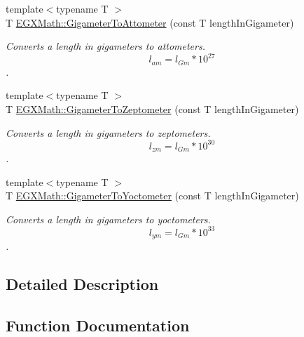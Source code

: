 \begin{DoxyCompactItemize}
{\footnotesize template$<$typename T $>$ }\\T \mbox{\hyperlink{group___e_g_x_math-_conversions-_length_conversions-_gigameter-_s_i_ga43e0ac7c59e4df08c27ed864c64e6008}{E\+G\+X\+Math\+::\+Gigameter\+To\+Attometer}} (const T length\+In\+Gigameter)
\begin{DoxyCompactList}\small\item\em Converts a length in gigameters to attometers. \[ l_{am}=l_{Gm} * 10^{27} \]. \end{DoxyCompactList}\item 
{\footnotesize template$<$typename T $>$ }\\T \mbox{\hyperlink{group___e_g_x_math-_conversions-_length_conversions-_gigameter-_s_i_ga5013069156df55018bc5a7f57f236f08}{E\+G\+X\+Math\+::\+Gigameter\+To\+Zeptometer}} (const T length\+In\+Gigameter)
\begin{DoxyCompactList}\small\item\em Converts a length in gigameters to zeptometers. \[ l_{zm}=l_{Gm} * 10^{30} \]. \end{DoxyCompactList}\item 
{\footnotesize template$<$typename T $>$ }\\T \mbox{\hyperlink{group___e_g_x_math-_conversions-_length_conversions-_gigameter-_s_i_ga2eff69e0a00032c24617fde4ac30bd49}{E\+G\+X\+Math\+::\+Gigameter\+To\+Yoctometer}} (const T length\+In\+Gigameter)
\begin{DoxyCompactList}\small\item\em Converts a length in gigameters to yoctometers. \[ l_{ym}=l_{Gm} * 10^{33} \]. \end{DoxyCompactList}\end{DoxyCompactItemize}


\subsection{Detailed Description}


\subsection{Function Documentation}
\mbox{\label{group___e_g_x_math-_conversions-_length_conversions-_gigameter-_s_i_ga43e0ac7c59e4df08c27ed864c64e6008}} 

